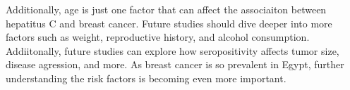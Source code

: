 \documentclass[12pt, titlepage]{article}
\begin{document}
Additionally, age is just one factor that can affect the associaiton 
between hepatitus C and breast cancer. Future studies should dive 
deeper into more factors such as weight, reproductive history, 
and alcohol consumption. Addiitonally, future studies can explore how 
seropositivity affects tumor size, disease agression, and more. As 
breast cancer is so prevalent in Egypt, further understanding the 
risk factors is becoming even more important. 

\pagebreak



\end{document}
